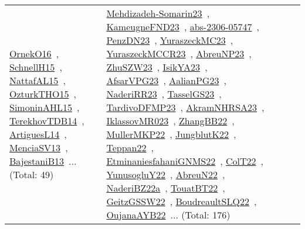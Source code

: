 {\begin{longtable}{lp{3cm}>{\raggedright\arraybackslash}p{6cm}>{\raggedright\arraybackslash}p{6cm}>{\raggedright\arraybackslash}p{8cm}}
\href{../works/OrnekO16.pdf}{OrnekO16}~\cite{OrnekO16}, \href{../works/SchnellH15.pdf}{SchnellH15}~\cite{SchnellH15}, \href{../works/NattafAL15.pdf}{NattafAL15}~\cite{NattafAL15}, \href{../works/OzturkTHO15.pdf}{OzturkTHO15}~\cite{OzturkTHO15}, \href{../works/SimoninAHL15.pdf}{SimoninAHL15}~\cite{SimoninAHL15}, \href{../works/TerekhovTDB14.pdf}{TerekhovTDB14}~\cite{TerekhovTDB14}, \href{../works/ArtiguesL14.pdf}{ArtiguesL14}~\cite{ArtiguesL14}, \href{../works/MenciaSV13.pdf}{MenciaSV13}~\cite{MenciaSV13}, \href{../works/BajestaniB13.pdf}{BajestaniB13}~\cite{BajestaniB13}... (Total: 49) & \href{../works/Mehdizadeh-Somarin23.pdf}{Mehdizadeh-Somarin23}~\cite{Mehdizadeh-Somarin23}, \href{../works/KameugneFND23.pdf}{KameugneFND23}~\cite{KameugneFND23}, \href{../works/abs-2306-05747.pdf}{abs-2306-05747}~\cite{abs-2306-05747}, \href{../works/PenzDN23.pdf}{PenzDN23}~\cite{PenzDN23}, \href{../works/YuraszeckMC23.pdf}{YuraszeckMC23}~\cite{YuraszeckMC23}, \href{../works/YuraszeckMCCR23.pdf}{YuraszeckMCCR23}~\cite{YuraszeckMCCR23}, \href{../works/AbreuNP23.pdf}{AbreuNP23}~\cite{AbreuNP23}, \href{../works/ZhuSZW23.pdf}{ZhuSZW23}~\cite{ZhuSZW23}, \href{../works/IsikYA23.pdf}{IsikYA23}~\cite{IsikYA23}, \href{../works/AfsarVPG23.pdf}{AfsarVPG23}~\cite{AfsarVPG23}, \href{../works/AalianPG23.pdf}{AalianPG23}~\cite{AalianPG23}, \href{../works/NaderiRR23.pdf}{NaderiRR23}~\cite{NaderiRR23}, \href{../works/TasselGS23.pdf}{TasselGS23}~\cite{TasselGS23}, \href{../works/TardivoDFMP23.pdf}{TardivoDFMP23}~\cite{TardivoDFMP23}, \href{../works/AkramNHRSA23.pdf}{AkramNHRSA23}~\cite{AkramNHRSA23}, \href{../works/IklassovMR023.pdf}{IklassovMR023}~\cite{IklassovMR023}, \href{../works/ZhangBB22.pdf}{ZhangBB22}~\cite{ZhangBB22}, \href{../works/MullerMKP22.pdf}{MullerMKP22}~\cite{MullerMKP22}, \href{../works/JungblutK22.pdf}{JungblutK22}~\cite{JungblutK22}, \href{../works/Teppan22.pdf}{Teppan22}~\cite{Teppan22}, \href{../works/EtminaniesfahaniGNMS22.pdf}{EtminaniesfahaniGNMS22}~\cite{EtminaniesfahaniGNMS22}, \href{../works/ColT22.pdf}{ColT22}~\cite{ColT22}, \href{../works/YunusogluY22.pdf}{YunusogluY22}~\cite{YunusogluY22}, \href{../works/AbreuN22.pdf}{AbreuN22}~\cite{AbreuN22}, \href{../works/NaderiBZ22a.pdf}{NaderiBZ22a}~\cite{NaderiBZ22a}, \href{../works/TouatBT22.pdf}{TouatBT22}~\cite{TouatBT22}, \href{../works/GeitzGSSW22.pdf}{GeitzGSSW22}~\cite{GeitzGSSW22}, \href{../works/BoudreaultSLQ22.pdf}{BoudreaultSLQ22}~\cite{BoudreaultSLQ22}, \href{../works/OujanaAYB22.pdf}{OujanaAYB22}~\cite{OujanaAYB22}... (Total: 176)\\

\end{longtable}}
